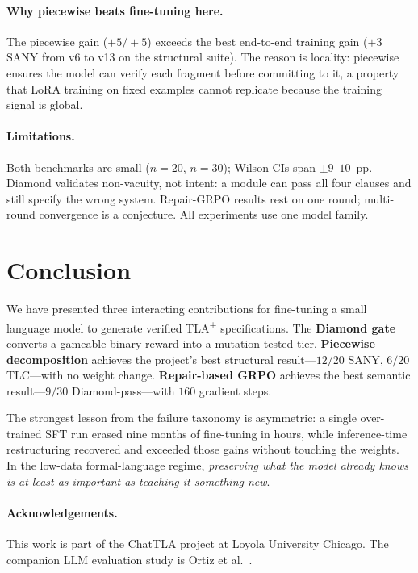 \documentclass[10pt,twocolumn]{article}
\begin{document}
\paragraph{Why piecewise beats fine-tuning here.}
The piecewise gain ($+5/+5$) exceeds the best end-to-end training gain
($+3$ SANY from v6 to v13 on the structural suite).
The reason is locality: piecewise ensures the model can verify each
fragment before committing to it, a property that LoRA training on fixed
examples cannot replicate because the training signal is global.

\paragraph{Limitations.}
Both benchmarks are small ($n\!=\!20$, $n\!=\!30$); Wilson CIs span
$\pm 9$--$10$~pp.
Diamond validates non-vacuity, not intent: a module can pass all four clauses
and still specify the wrong system.
Repair-GRPO results rest on one round; multi-round convergence is a
conjecture.
All experiments use one model family.

\section{Conclusion}
\label{sec:conclusion}

We have presented three interacting contributions for fine-tuning a small
language model to generate verified TLA\textsuperscript{+} specifications.
The \textbf{Diamond gate} converts a gameable binary reward into a
mutation-tested tier.
\textbf{Piecewise decomposition} achieves the project's best structural
result---$12/20$ SANY, $6/20$ TLC---with no weight change.
\textbf{Repair-based GRPO} achieves the best semantic result---$9/30$
Diamond-pass---with $160$ gradient steps.

The strongest lesson from the failure taxonomy is asymmetric: a single
over-trained SFT run erased nine months of fine-tuning in hours, while
inference-time restructuring recovered and exceeded those gains without
touching the weights.
In the low-data formal-language regime, \emph{preserving what the model
already knows is at least as important as teaching it something new}.

\paragraph{Acknowledgements.}
This work is part of the ChatTLA project at Loyola University Chicago.
The companion LLM evaluation study is Ortiz et al.~\cite{ortiz2026formallm}.
\end{document}
